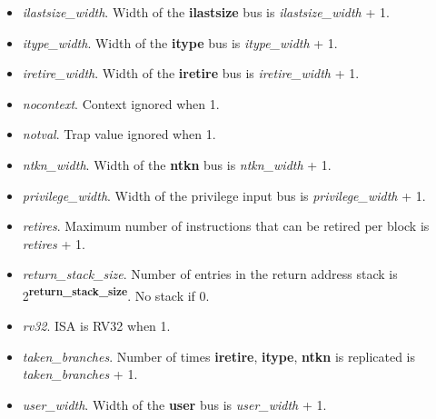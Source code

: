 \begin{itemize}
    \item \textit{ilastsize\_width}. Width of the \textbf{ilastsize} bus is \textit{ilastsize\_width} + 1.
    \item \textit{itype\_width}. Width of the \textbf{itype} bus is \textit{itype\_width} + 1.
    \item \textit{iretire\_width}. Width of the \textbf{iretire} bus is \textit{iretire\_width} + 1.
    \item \textit{nocontext}. Context ignored when 1.
    \item \textit{notval}. Trap value ignored when 1.
    \item \textit{ntkn\_width}. Width of the \textbf{ntkn} bus is \textit{ntkn\_width} + 1.
    \item \textit{privilege\_width}. Width of the privilege input bus is \textit{privilege\_width} + 1.
    \item \textit{retires}. Maximum number of instructions that can be retired per block is \textit{retires} + 1.
    \item \textit{return\_stack\_size}. Number of entries in the return address stack is 2\textsuperscript{\textbf{return\_stack\_size}}. No stack if 0.
    \item \textit{rv32}. ISA is RV32 when 1.
    \item \textit{taken\_branches}. Number of times \textbf{iretire}, \textbf{itype}, \textbf{ntkn} is replicated is \textit{taken\_branches} + 1.
    \item \textit{user\_width}. Width of the \textbf{user} bus is \textit{user\_width} + 1.
\end{itemize}
